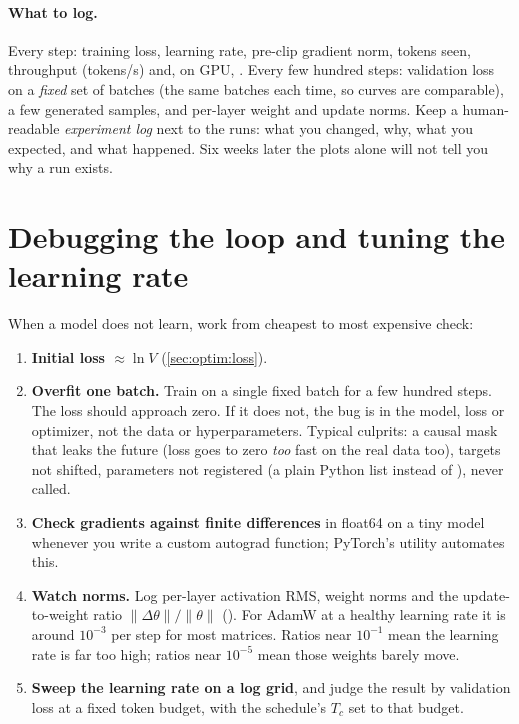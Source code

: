 \paragraph{What to log.} Every step: training loss, learning rate, pre-clip gradient norm, tokens
seen, throughput (tokens/s) and, on GPU, . Every few
hundred steps: validation loss on a \emph{fixed} set of batches (the same batches each time, so
curves are comparable), a few generated samples, and per-layer weight and update norms. Keep a
human-readable \emph{experiment log} next to the runs: what you changed, why, what you expected,
and what happened. Six weeks later the plots alone will not tell you why a run exists.

\section{Debugging the loop and tuning the learning rate}\label{sec:optim:debug}

When a model does not learn, work from cheapest to most expensive check:

\begin{enumerate}
  \item \textbf{Initial loss $\approx \ln V$} (\cref{sec:optim:loss}).
  \item \textbf{Overfit one batch.} Train on a single fixed batch for a few hundred steps. The loss
        should approach zero. If it does not, the bug is in the model, loss or optimizer, not
        the data or hyperparameters. Typical culprits: a causal mask that leaks the
        future (loss goes to zero \emph{too} fast on the real data too), targets not shifted,
        parameters not registered (a plain Python list instead of ),
         never called.
  \item \textbf{Check gradients against finite differences} in float64 on a tiny model
        whenever you write a custom autograd function; PyTorch's  utility
        automates this.
  \item \textbf{Watch norms.} Log per-layer activation RMS, weight norms and the update-to-weight
        ratio $\|\Delta\theta\|/\|\theta\|$ (). For AdamW at a
        healthy learning rate it is around $10^{-3}$ per step for most matrices. Ratios near
        $10^{-1}$ mean the learning rate is far too high; ratios near $10^{-5}$ mean those weights
        barely move.
  \item \textbf{Sweep the learning rate on a log grid}, and judge the result by validation loss at a fixed
        token budget, with the schedule's $T_c$ set to that budget.
\end{enumerate}

